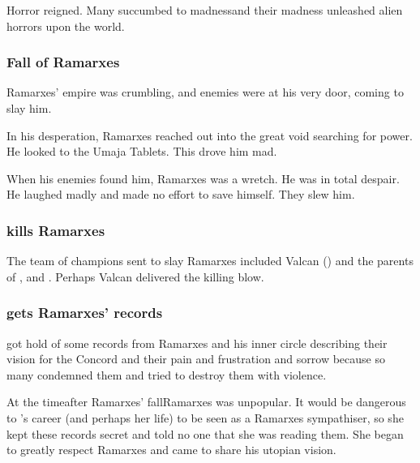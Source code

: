 Horror reigned. 
Many \ophidians succumbed to madness\dash and their madness unleashed alien horrors upon the world. 





\subsubsection{Fall of Ramarxes}
Ramarxes' empire was crumbling, and enemies were at his very door, coming to slay him. 

In his desperation, Ramarxes reached out into the great void searching for power.
He looked to the Umaja Tablets. 
This drove him mad. 

When his enemies found him, Ramarxes was a wretch. 
He was in total despair. 
He laughed madly and made no effort to save himself. 
They slew him. 





\subsubsection{\Sethicus kills Ramarxes}
The team of champions sent to slay Ramarxes included Valcan () and the parents of \Nexagglachel, \Iscrafel and \Secherdamon. 
Perhaps Valcan delivered the killing blow. 





\subsubsection[Tyrasshana gets Ramarxes' records]{\Tiamat gets Ramarxes' records}
\Tiamat got hold of some records from Ramarxes and his inner circle describing their vision for the Concord and their pain and frustration and sorrow because so many condemned them and tried to destroy them with violence.

At the time\dash after Ramarxes' fall\dash Ramarxes was unpopular.
It would be dangerous to \Tiamat's career (and perhaps her life) to be seen as a Ramarxes sympathiser, so she kept these records secret and told no one that she was reading them. 
She began to greatly respect Ramarxes and came to share his utopian vision. 

























